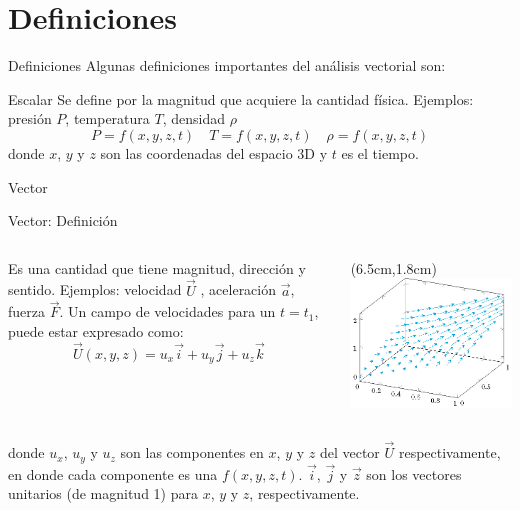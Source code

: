\documentclass [xcolor=svgnames, t] {beamer}
\begin{document}
\section{Definiciones}
\begin{frame}{Definiciones}
Algunas definiciones importantes del an\'alisis vectorial son:
\begin{block}{Escalar}
Se define por la magnitud que acquiere la cantidad f\'isica. Ejemplos: presi\'on $P$, temperatura $T$, densidad $\rho$
$$
P=f(x,y,z,t) \quad T=f(x,y,z,t) \quad \rho=f(x,y,z,t)
$$
donde $x$, $y$ y $z$ son las coordenadas del espacio 3D y $t$ es el tiempo.
\end{block}
\end{frame}

\begin{frame}{Vector}
\vspace{-0.4cm}
\begin{block}{Vector: Definici\'on}
\begin{columns}
Es una cantidad que tiene magnitud, direcci\'on y sentido. Ejemplos: velocidad $\vec{U}$ , aceleraci\'on $\vec{a}$, fuerza $\vec{F}$. Un campo de velocidades para un $t=t_1$, puede estar expresado como:
$$
\vec{U}(x,y,z)=u_x \vec{i} + u_y \vec{j} + u_z \vec{k}
$$ 
\begin{textblock*}{5.5cm}(6.5cm,1.8cm) %
\includegraphics[width=\textwidth]{vecf}
\end{textblock*}
\end{columns}
\vspace{0.5cm}
donde $u_x$, $u_y$ y $u_z$ son las componentes en $x$, $y$ y $z$ del vector $\vec{U}$ respectivamente, en donde cada componente es una $f(x,y,z,t)$. $\vec{i}$, $\vec{j}$ y $\vec{z}$ son los vectores unitarios (de magnitud 1) para $x$, $y$ y $z$, respectivamente. 
\end{block}
\end{frame}
\end{document}
